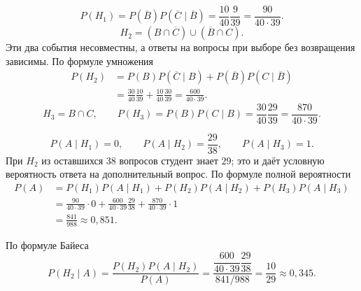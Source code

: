 \[
 P(H_1)=P(\overline B)P(\overline C\mid\overline B)
 =\frac{10}{40}\frac9{39}=\frac{90}{40\cdot39}.
\]
\[
 H_2=(B\cap\overline C)\cup(\overline B\cap C).
\]
Эти два события несовместны, а ответы на вопросы при выборе без возвращения
зависимы. По формуле умножения
\begin{align*}
 P(H_2)&=P(B)P(\overline C\mid B)+P(\overline B)P(C\mid\overline B)\\
 &=\frac{30}{40}\frac{10}{39}+\frac{10}{40}\frac{30}{39}
 =\frac{600}{40\cdot39}.
\end{align*}
\[
 H_3=B\cap C,\qquad
 P(H_3)=P(B)P(C\mid B)=\frac{30}{40}\frac{29}{39}
 =\frac{870}{40\cdot39}.
\]

\[
 P(A\mid H_1)=0,\qquad P(A\mid H_2)=\frac{29}{38},\qquad
 P(A\mid H_3)=1.
\]
При $H_2$ из оставшихся $38$ вопросов студент знает $29$;
это и даёт условную вероятность ответа на дополнительный вопрос.
По формуле полной вероятности
\begin{align*}
 P(A)&=P(H_1)P(A\mid H_1)+P(H_2)P(A\mid H_2)+P(H_3)P(A\mid H_3)\\
 &=\frac{90}{40\cdot39}\cdot0
 +\frac{600}{40\cdot39}\frac{29}{38}
 +\frac{870}{40\cdot39}\cdot1\\
 &=\frac{841}{988}\approx0{,}851.
\end{align*}

По формуле Байеса
\[
 P(H_2\mid A)=\frac{P(H_2)P(A\mid H_2)}{P(A)}
 =\frac{\dfrac{600}{40\cdot39}\dfrac{29}{38}}{841/988}
 =\frac{10}{29}\approx0{,}345.
\]

